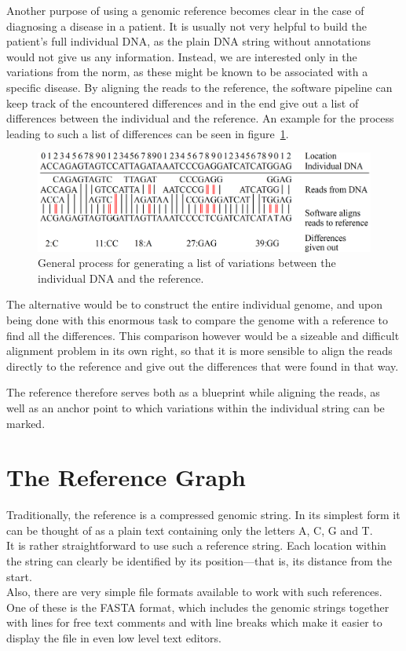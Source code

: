 \documentclass[a4paper,12pt,twoside,BCOR=10mm]{scrbook}
\begin{document}
Another purpose of using a genomic reference becomes clear
in the case of diagnosing a disease in a patient.
It is usually not very helpful to build the patient's full individual DNA, as the plain DNA string without
annotations would not give us any information.
Instead, we are interested only in the variations from the norm,
as these might be known to be associated with a specific disease.
By aligning the reads to the reference, the software pipeline can keep track
of the encountered differences and in the end give out a list of differences between the individual and the reference.
An example for the process leading to such a list of differences
can be seen in figure~\ref{fig:evo_intro_general_variation_calling_process}.
\begin{figure}[!htb]
\centering
\includegraphics[width=\textwidth]{evo_intro_general_variation_calling_process.png}
\caption[General variation calling process]{General process for generating a list of variations between the individual DNA and the reference.} \label{fig:evo_intro_general_variation_calling_process}
\end{figure}
The alternative would be to construct the entire individual genome, and upon being done with this enormous task to
compare the genome with a reference to find all the differences. This comparison however would be a sizeable
and difficult alignment problem in its own right, so that it is more sensible to align the reads directly to the reference
and give out the differences that were found in that way.

The reference therefore serves both as a blueprint while aligning the reads,
as well as an anchor point to which variations within the individual string can be marked.

\section{The Reference Graph}

Traditionally, the reference is a compressed genomic string.
In its simplest form it can be thought of as a plain text containing only the letters
A, C, G and T. \\
It is rather straightforward to use such a reference string.
Each location within the string can clearly be identified by its position---that is,
its distance from the start. \\
Also, there are very simple file formats available to work with
such references. One of these is the FASTA format, which includes the genomic
strings together with lines for free text comments and with line breaks which
make it easier to display the file in even low level text editors.
\end{document}
